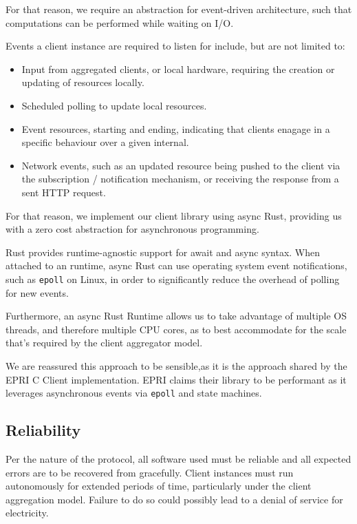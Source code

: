 For that reason, we require an abstraction for event-driven architecture, such that computations can be performed while waiting on I/O.

Events a client instance are required to listen for include, but are not limited to:

\begin{itemize}
    \item Input from aggregated clients, or local hardware, requiring the creation or updating of resources locally.
    \item Scheduled polling to update local resources.
    \item Event resources, starting and ending, indicating that clients enagage in a specific behaviour over a given internal.
    \item Network events, such as an updated resource being pushed to the client via the subscription / notification mechanism, or receiving the response from a sent HTTP request.
\end{itemize}

For that reason, we implement our client library using async Rust, providing us with a zero cost abstraction for asynchronous programming.

Rust provides runtime-agnostic support for await and async syntax.
When attached to an runtime, async Rust can use operating system event notifications, such as \texttt{epoll} on Linux, in order to significantly reduce the overhead of polling for new events.

Furthermore, an async Rust Runtime allows us to take advantage of multiple OS threads, and therefore multiple CPU cores, as to best accommodate for the scale that's required by the client aggregator model.

We are reassured this approach to be sensible,as it is the approach shared by the EPRI C Client implementation. EPRI claims their library to be performant as it leverages asynchronous events via \texttt{epoll} and state machines.


\subsection{Reliability}
Per the nature of the protocol, all software used must be reliable and all expected errors are to be recovered from gracefully. Client instances must run autonomously for extended periods of time, particularly under the client aggregation model. Failure to do so could possibly lead to a denial of service for electricity.

